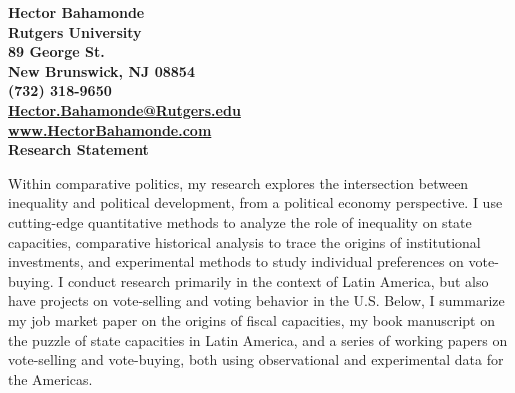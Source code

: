 \documentclass[11pt]{letter} %
\date{}
\begin{document}

\begin{letter}{} 


\begin{center}
\large\bf Hector Bahamonde \\ %
Rutgers University\\
89 George St. \\ New Brunswick, NJ 08854 \\ (732) 318-9650 \\ 
\href{mailto:hector.bahamonde@rutgers.edu}{Hector.Bahamonde@Rutgers.edu} \\
\href{http://www.hectorbahamonde.com}{www.HectorBahamonde.com}\\

{\huge\vspace{8mm} Research Statement}
\end{center} 


\opening{} 
 
Within comparative politics, my research explores the intersection between inequality and political development, from a political economy perspective. I use cutting-edge quantitative methods to analyze the role of inequality on state capacities, comparative historical analysis to trace the origins of institutional investments, and experimental methods to study individual preferences on vote-buying. I conduct research primarily in the context of Latin America, but also have projects on vote-selling and voting behavior in the U.S. Below, I summarize my job market paper on the origins of fiscal capacities, my book manuscript on the puzzle of state capacities in Latin America, and a series of working papers on vote-selling and vote-buying, both using observational and experimental data for the Americas.


\end{letter}
\end{document}
